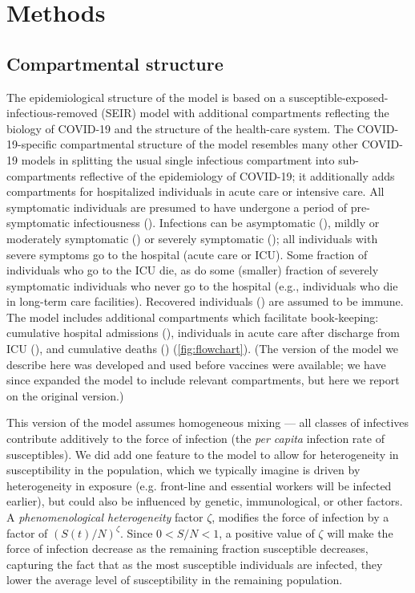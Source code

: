 \documentclass[12pt]{article}\usepackage[]{graphicx}\usepackage[]{color}
\begin{document}
\section{Methods}

\subsection*{Compartmental structure}

The epidemiological structure of the model is based on
a susceptible-exposed-infectious-removed (SEIR) model with
additional compartments reflecting the biology of COVID-19 and the
structure of the health-care system. The COVID-19-specific compartmental structure
of the model resembles many other COVID-19 models
in splitting the usual single infectious compartment into sub-compartments reflective
of the epidemiology of COVID-19; it additionally adds
compartments for hospitalized individuals in acute care
or intensive care. All symptomatic individuals are
presumed to have undergone a period of pre-symptomatic infectiousness
(). Infections can be
asymptomatic (), mildly or moderately symptomatic () or
severely symptomatic (); all individuals with severe symptoms
go to the hospital (acute care or ICU).
Some fraction of individuals who go to the ICU die,
as do some (smaller) fraction of severely symptomatic individuals who
never go to the hospital (e.g., individuals who die in long-term care facilities).
Recovered individuals () are
assumed to be immune.  The model
includes additional compartments which facilitate book-keeping:
cumulative hospital admissions (), individuals in acute care
after discharge from ICU (), and cumulative deaths
() (\cref{fig:flowchart}).
(The version of the model we describe here was developed and used before vaccines
were available; we have since expanded the model to include relevant compartments,
but here we report on the original version.)

This version of the model assumes homogeneous mixing --- all classes of infectives contribute
additively to the force of infection (the \emph{per capita} infection rate of susceptibles).
We did add one feature to the model to allow for heterogeneity in susceptibility in the population,
which we typically imagine is driven by heterogeneity in exposure (e.g. front-line and essential
workers will be infected earlier), but could also be influenced by genetic, immunological, or other factors.
A \emph{phenomenological heterogeneity} factor $\zeta$, modifies the force of infection by a
factor of $\left(S(t)/N\right)^\zeta$. Since $0 < S/N < 1$, a positive value of $\zeta$ will make the
force of infection decrease as the remaining fraction susceptible decreases, capturing the fact
that as the most susceptible individuals are infected, they lower the average level of susceptibility
in the remaining population.
\end{document}
